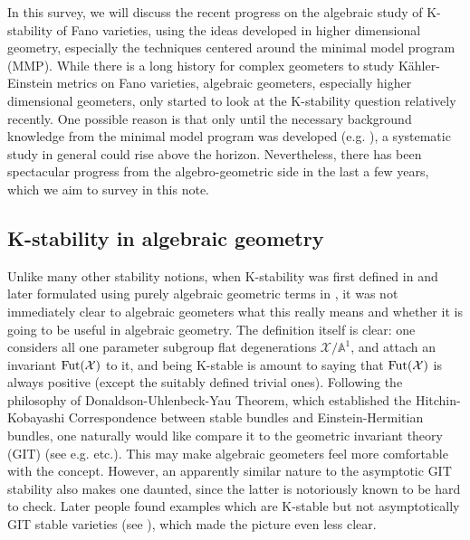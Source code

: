 \documentclass[12pt,reqno]{amsart}%
\newcommand{\bA}{{\mathbb{A} }}
\newcommand{\cX}{{\mathcal{X}}}
\theoremstyle{definition}
\theoremstyle{remark}
\newcommand{\Fut}{{\rm Fut}}
\begin{document}
In this survey, we will discuss the recent progress on the algebraic study of K-stability of Fano varieties, using the ideas developed in higher dimensional geometry, especially the techniques centered around the minimal model program (MMP). While there is a long history for complex geometers to study  K\"ahler-Einstein metrics on Fano varieties, algebraic geometers, especially higher dimensional geometers, only started to look at the K-stability question relatively recently.  One possible reason is that only until the necessary background knowledge from the minimal model program was developed (e.g. \cite{BCHM10}), a systematic study in general could rise above the horizon.  Nevertheless, there has been spectacular progress from the algebro-geometric side in the last a few years, which we aim to survey in this note. 

\subsection{K-stability in algebraic geometry} 
Unlike many other stability notions, when K-stability was first defined in \cite{Tia97} and later formulated using purely algebraic geometric terms in \cite{Don02}, it was not immediately clear to algebraic geometers what this really means and whether it is going to be useful in algebraic geometry.  The definition itself is clear: one considers all one parameter subgroup flat degenerations $\cX/\bA^1$, and attach an invariant $\Fut(\cX)$ to it, and being K-stable is amount to saying that $\Fut(\cX)$ is always positive (except the suitably defined trivial ones). Following the philosophy of Donaldson-Uhlenbeck-Yau Theorem, which established the Hitchin-Kobayashi Correspondence between stable bundles and Einstein-Hermitian bundles, one naturally would like compare it to the geometric invariant theory (GIT) (see e.g. \cite{PT04, RT07} etc.). This may make algebraic geometers feel more comfortable with the concept. However, an apparently similar nature to the asymptotic GIT stability also makes one daunted, since the latter is notoriously known to be hard to check. Later people found examples which are K-stable but not asymptotically GIT stable varieties (see \cite{OSY12}), which made the picture even less clear. 

\smallskip
\end{document}
